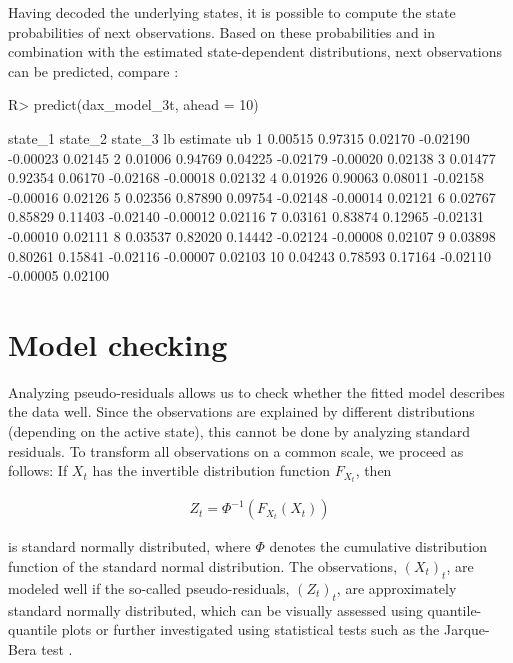 \documentclass[article]{jss}
\begin{document}
Having decoded the underlying states, it is possible to compute the state probabilities of next observations. Based on these probabilities and in combination with the estimated state-dependent distributions, next observations can be predicted, compare \cite{zuc16}:

%
\begin{Schunk}
\begin{Sinput}
R> predict(dax_model_3t, ahead = 10)
\end{Sinput}
\begin{Soutput}
   state_1 state_2 state_3       lb estimate      ub
1  0.00515 0.97315 0.02170 -0.02190 -0.00023 0.02145
2  0.01006 0.94769 0.04225 -0.02179 -0.00020 0.02138
3  0.01477 0.92354 0.06170 -0.02168 -0.00018 0.02132
4  0.01926 0.90063 0.08011 -0.02158 -0.00016 0.02126
5  0.02356 0.87890 0.09754 -0.02148 -0.00014 0.02121
6  0.02767 0.85829 0.11403 -0.02140 -0.00012 0.02116
7  0.03161 0.83874 0.12965 -0.02131 -0.00010 0.02111
8  0.03537 0.82020 0.14442 -0.02124 -0.00008 0.02107
9  0.03898 0.80261 0.15841 -0.02116 -0.00007 0.02103
10 0.04243 0.78593 0.17164 -0.02110 -0.00005 0.02100
\end{Soutput}
\end{Schunk}
%




\section{Model checking} \label{sec:model_checking} %

Analyzing pseudo-residuals allows us to check whether the fitted model describes the data well. Since the observations are explained by different distributions (depending on the active state), this cannot be done by analyzing standard residuals. To transform all observations on a common scale, we proceed as follows: If $X_t$ has the invertible distribution function $F_{X_t}$, then

\begin{align*}
Z_t=\Phi^{-1}(F_{X_t} (X_t))
\end{align*}

is standard normally distributed, where $\Phi$ denotes the cumulative distribution function of the standard normal distribution. The observations, $(X_t)_t$, are modeled well if the so-called pseudo-residuals, $(Z_t)_t$, are approximately standard normally distributed, which can be visually assessed using quantile-quantile plots or further investigated using statistical tests such as the Jarque-Bera test \cite{zuc16}. 
\end{document}
